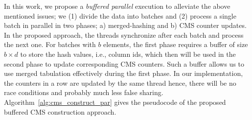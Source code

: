 \documentclass[runningheads]{llncs}
\begin{document}
In this work, we propose a {\em buffered parallel} execution to alleviate the above mentioned issues; we (1) divide the data into batches and (2) process a single batch in parallel in two phases; a) merged-hashing and b) CMS counter updates. In the proposed approach, the threads synchronize after each batch and process the next one. For batches with $b$ elements, the first phase requires a buffer of size $b \times d$ to store the hash values, i.e., column ids, which then will be used in the second phase to update corresponding CMS counters. Such a buffer allows us to use merged tabulation effectively during the first phase. In our implementation, the counters in a row are updated by the same thread hence, there will be no race conditions and probably much less false sharing. Algorithm~\ref{alg:cms_construct_par} gives the pseudocode of the proposed buffered CMS construction approach. 
\end{document}
